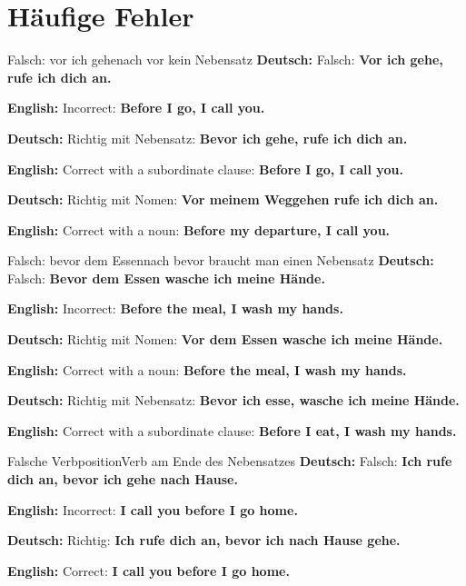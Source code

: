 \documentclass[a4paper,11pt]{article}
\newcommand{\GermanText}[1]{\textbf{Deutsch: }#1\par}
\newcommand{\EnglishText}[1]{{\small\color{SoftGray}\textbf{English: }#1\par}}
\begin{document}
    \section{Häufige Fehler}

        \begin{grammarentry}{Falsch: \glqq vor ich gehe\grqq}{nach \glqq vor\grqq{} kein Nebensatz}
            \GermanText{Falsch: \textbf{Vor ich gehe, rufe ich dich an.}}
            \EnglishText{Incorrect: \textbf{Before I go, I call you.}}

            \GermanText{Richtig mit Nebensatz: \textbf{Bevor ich gehe, rufe ich dich an.}}
            \EnglishText{Correct with a subordinate clause: \textbf{Before I go, I call you.}}

            \GermanText{Richtig mit Nomen: \textbf{Vor meinem Weggehen rufe ich dich an.}}
            \EnglishText{Correct with a noun: \textbf{Before my departure, I call you.}}
        \end{grammarentry}

        \begin{grammarentry}{Falsch: \glqq bevor dem Essen\grqq}{nach \glqq bevor\grqq{} braucht man einen Nebensatz}
            \GermanText{Falsch: \textbf{Bevor dem Essen wasche ich meine Hände.}}
            \EnglishText{Incorrect: \textbf{Before the meal, I wash my hands.}}

            \GermanText{Richtig mit Nomen: \textbf{Vor dem Essen wasche ich meine Hände.}}
            \EnglishText{Correct with a noun: \textbf{Before the meal, I wash my hands.}}

            \GermanText{Richtig mit Nebensatz: \textbf{Bevor ich esse, wasche ich meine Hände.}}
            \EnglishText{Correct with a subordinate clause: \textbf{Before I eat, I wash my hands.}}
        \end{grammarentry}

        \begin{grammarentry}{Falsche Verbposition}{Verb am Ende des Nebensatzes}
            \GermanText{Falsch: \textbf{Ich rufe dich an, bevor ich gehe nach Hause.}}
            \EnglishText{Incorrect: \textbf{I call you before I go home.}}

            \GermanText{Richtig: \textbf{Ich rufe dich an, bevor ich nach Hause gehe.}}
            \EnglishText{Correct: \textbf{I call you before I go home.}}
        \end{grammarentry}


\end{document}
